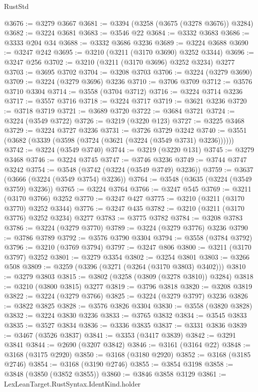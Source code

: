 \begin{lexlean}{RustStd}
\begin{coremodule}
@3676 := @3279 @3667
@3681 := @3394 (@3258 (@3675 (@3278 @3676)) @3284)
@3682 := @3224 @3681
@3683 := @3546 @22
@3684 := @3332 @3683
@3686 := @3333 @204 @34
@3688 := @3332 @3686 @3236
@3689 := @3224 @3688
@3690 := @3247 @242
@3695 := @3210 (@3211 (@3170 @3690) @3252 @3344)
@3696 := @3247 @256
@3702 := @3210 (@3211 (@3170 @3696) @3252 @3234) @3277
@3703 := @3695 @3702
@3704 := @3208 @3703
@3706 := @3224 (@3279 @3690)
@3709 := @3224 (@3279 @3696) @3236
@3710 := @3706 @3709
@3712 := @3576 @3710 @3304
@3714 := @3558 (@3704 @3712)
@3716 := @3224 @3714 @3236
@3717 := @3557 @3716
@3718 := @3224 @3717
@3719 := @3621 @3236
@3720 := @3718 @3719
@3721 := @3689 @3720
@3722 := @3684 @3721
@3724 := @3224 (@3549 @3722)
@3726 := @3219 (@3220 @123)
@3727 := @3225 @3468
@3729 := @3224 @3727 @3236
@3731 := @3726 @3729 @3242
@3740 := @3551 (@3682 (@3339 (@3598 (@3724 (@3621 (@3224 (@3549 @3731) @3236))))))
@3742 := @3224 (@3549 @3740)
@3744 := @3219 (@3220 @131)
@3745 := @3279 @3468
@3746 := @3224 @3745
@3747 := @3746 @3236
@3749 := @3744 @3747 @3242
@3754 := @3548 (@3742 (@3224 (@3549 @3749) @3236))
@3759 := @3637 (@3666 (@3224 (@3549 @3754) @3236))
@3764 := @3548 (@3635 (@3224 (@3549 @3759) @3236))
@3765 := @3224 @3764
@3766 := @3247 @545
@3769 := @3211 (@3170 @3766) @3252
@3770 := @3247 @427
@3775 := @3210 (@3211 (@3170 @3770) @3252 @3344)
@3776 := @3247 @435
@3782 := @3210 (@3211 (@3170 @3776) @3252 @3234) @3277
@3783 := @3775 @3782
@3784 := @3208 @3783
@3786 := @3224 (@3279 @3770)
@3789 := @3224 (@3279 @3776) @3236
@3790 := @3786 @3789
@3792 := @3576 @3790 @3304
@3794 := @3558 (@3784 @3792)
@3796 := @3210 (@3769 @3794)
@3797 := @3247 @806
@3800 := @3211 (@3170 @3797) @3252
@3801 := @3279 @3354
@3802 := @3254 @3801
@3803 := @3266 @508
@3809 := @3259 (@3396 (@3271 (@3264 (@3170 @3803) @3402)))
@3810 := @3279 @3803
@3815 := @3802 (@3258 (@3809 (@3278 @3810)) @3284)
@3818 := @3210 (@3800 @3815) @3277
@3819 := @3796 @3818
@3820 := @3208 @3819
@3822 := @3224 (@3279 @3766)
@3825 := @3224 (@3279 @3797) @3236
@3826 := @3822 @3825
@3828 := @3576 @3826 @3304
@3830 := @3558 (@3820 @3828)
@3832 := @3224 @3830 @3236
@3833 := @3765 @3832
@3834 := @3545 @3833
@3835 := @3527 @3834
@3836 := @3336 @3835
@3837 := @3331 @3836
@3839 := @3467 (@3526 @3837)
@3841 := @3353 (@3417 @3839)
@3842 := @3291 @3841
@3844 := @2690 (@3207 @3842)
@3846 := @3161 (@3164 @22)
@3848 := @3168 (@3175 @2920)
@3850 := @3168 (@3180 @2920)
@3852 := @3168 (@3185 @2746)
@3854 := @3168 (@3190 @2746)
@3855 := @3854 @3198
@3858 := @3848 (@3850 (@3852 @3855))
@3860 := @3846 @3858 @3129
@3861 := LexLeanTarget.RustSyntax.IdentKind.holder

\end{coremodule}
\end{lexlean}
